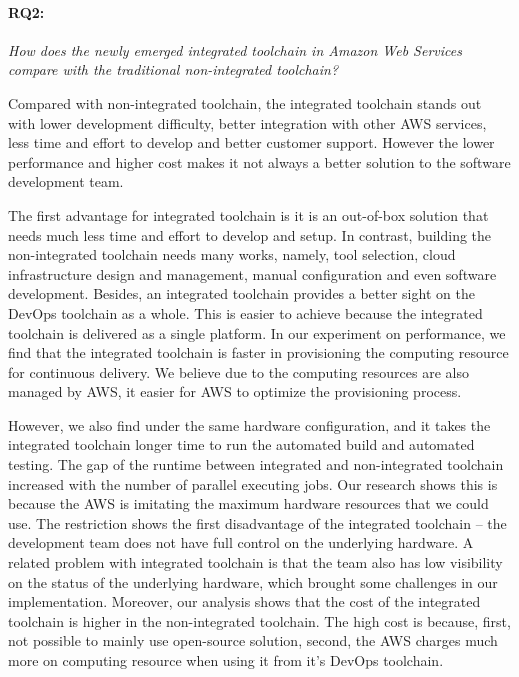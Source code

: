 \paragraph{RQ2:} \textit{How does the newly emerged integrated toolchain in Amazon Web Services compare with the traditional non-integrated toolchain?}
\medskip
\par
Compared with non-integrated toolchain, the integrated toolchain stands out with lower development difficulty, better integration with other AWS services, less time and effort to develop and better customer support. However the lower performance and higher cost makes it not always a better solution to the software development team.
\par
The first advantage for integrated toolchain is it is an out-of-box solution that needs much less time and effort to develop and setup. In contrast, building the non-integrated toolchain needs many works, namely, tool selection, cloud infrastructure design and management, manual configuration and even software development. Besides, an integrated toolchain provides a better sight on the DevOps toolchain as a whole. This is easier to achieve because the integrated toolchain is delivered as a single platform. In our experiment on performance, we find that the integrated toolchain is faster in provisioning the computing resource for continuous delivery. We believe due to the computing resources are also managed by AWS, it easier for AWS to optimize the provisioning process.
\par
However, we also find under the same hardware configuration, and it takes the integrated toolchain longer time to run the automated build and automated testing. The gap of the runtime between integrated and non-integrated toolchain increased with the number of parallel executing jobs.
Our research shows this is because the AWS is imitating the maximum hardware resources that we could use. The restriction shows the first disadvantage of the integrated toolchain -- the development team does not have full control on the underlying hardware. A related problem with integrated toolchain is that the team also has low visibility on the status of the underlying hardware, which brought some challenges in our implementation. Moreover, our analysis shows that the cost of the integrated toolchain is higher in the non-integrated toolchain. The high cost is because, first, not possible to mainly use open-source solution, second, the AWS charges much more on computing resource when using it from it's DevOps toolchain.
